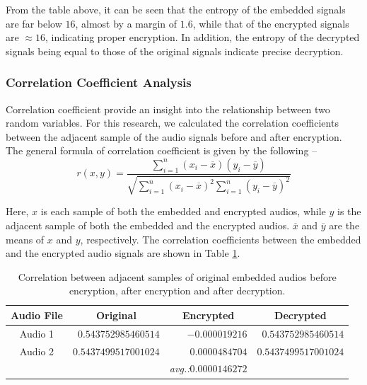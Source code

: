 \documentclass[a4paper]{cas-sc}
\begin{document}
From the table above, it can be seen that the entropy of the embedded signals are far below $16$, almost by a margin of $1.6$, while that of the encrypted signals are $\approx16$, indicating proper encryption. In addition, the entropy of the decrypted signals being equal
to those of the original signals indicate precise decryption.
\subsubsection{Correlation Coefficient Analysis}
Correlation coefficient provide an insight into the relationship between two random variables. For this research, we calculated the correlation coefficients between the adjacent sample of the audio signals before and after encryption. The general formula of correlation coefficient is given by the following --
\begin{equation}
    r(x,y)=\frac{\sum_{i=1}^{n}(x_i-\overline{x})(y_i-\overline{y})}{\sqrt{\sum_{i=1}^{n}(x_i-\overline{x})^2\sum_{i=1}^{n}(y_i-\overline{y})^2}}
\end{equation}

Here, $x$ is each sample of both the embedded and encrypted audios, while $y$ is the adjacent sample of both the embedded and the encrypted audios. $\overline{x}$ and $\overline{y}$ are the means of $x$ and $y$, respectively. The correlation coefficients between the embedded and the encrypted audio signals are shown in Table \ref{table:corrcoef}.
\begin{table}[pos=h]
    \begin{center}
        \caption{Correlation between adjacent samples of original embedded audios before encryption, after encryption and after decryption.}
        \begin{tabular}{crrr}
            \hline
            \multicolumn{1}{c|}{Audio File} & \multicolumn{1}{c}{Original} & \multicolumn{1}{c}{Encrypted}         & \multicolumn{1}{c}{Decrypted} \\ \hline
            \multicolumn{1}{c|}{Audio 1}    & $0.543752985460514$          & $-0.000019216$                        & $0.543752985460514$           \\
            \multicolumn{1}{c|}{Audio 2}    & $0.5437499517001024$         & $0.0000484704$                        & $0.5437499517001024$          \\ \hline
                                            &                              & \textit{avg.:}$\mathbf{0.0000146272}$ &                               \\
        \end{tabular}
        \label{table:corrcoef}
    \end{center}
\end{table}
\end{document}
